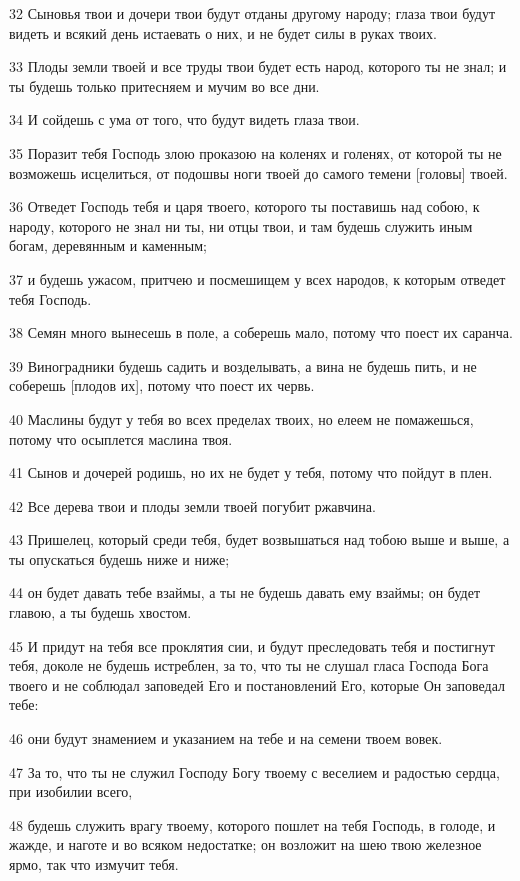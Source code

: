\par 32 Сыновья твои и дочери твои будут отданы другому народу; глаза твои будут видеть и всякий день истаевать о них, и не будет силы в руках твоих.
\par 33 Плоды земли твоей и все труды твои будет есть народ, которого ты не знал; и ты будешь только притесняем и мучим во все дни.
\par 34 И сойдешь с ума от того, что будут видеть глаза твои.
\par 35 Поразит тебя Господь злою проказою на коленях и голенях, от которой ты не возможешь исцелиться, от подошвы ноги твоей до самого темени [головы] твоей.
\par 36 Отведет Господь тебя и царя твоего, которого ты поставишь над собою, к народу, которого не знал ни ты, ни отцы твои, и там будешь служить иным богам, деревянным и каменным;
\par 37 и будешь ужасом, притчею и посмешищем у всех народов, к которым отведет тебя Господь.
\par 38 Семян много вынесешь в поле, а соберешь мало, потому что поест их саранча.
\par 39 Виноградники будешь садить и возделывать, а вина не будешь пить, и не соберешь [плодов их], потому что поест их червь.
\par 40 Маслины будут у тебя во всех пределах твоих, но елеем не помажешься, потому что осыплется маслина твоя.
\par 41 Сынов и дочерей родишь, но их не будет у тебя, потому что пойдут в плен.
\par 42 Все дерева твои и плоды земли твоей погубит ржавчина.
\par 43 Пришелец, который среди тебя, будет возвышаться над тобою выше и выше, а ты опускаться будешь ниже и ниже;
\par 44 он будет давать тебе взаймы, а ты не будешь давать ему взаймы; он будет главою, а ты будешь хвостом.
\par 45 И придут на тебя все проклятия сии, и будут преследовать тебя и постигнут тебя, доколе не будешь истреблен, за то, что ты не слушал гласа Господа Бога твоего и не соблюдал заповедей Его и постановлений Его, которые Он заповедал тебе:
\par 46 они будут знамением и указанием на тебе и на семени твоем вовек.
\par 47 За то, что ты не служил Господу Богу твоему с веселием и радостью сердца, при изобилии всего,
\par 48 будешь служить врагу твоему, которого пошлет на тебя Господь, в голоде, и жажде, и наготе и во всяком недостатке; он возложит на шею твою железное ярмо, так что измучит тебя.
